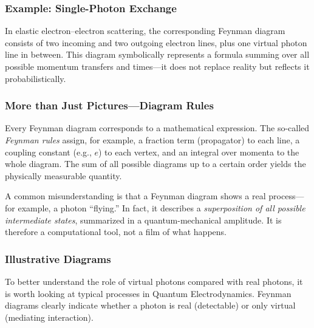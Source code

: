 \subsubsection*{Example: Single-Photon Exchange}
In elastic electron–electron scattering, the corresponding Feynman diagram consists of two incoming and two outgoing electron lines, plus one virtual photon line in between. This diagram symbolically represents a formula summing over all possible momentum transfers and times—it does not replace reality but reflects it probabilistically.

\subsubsection*{More than Just Pictures—Diagram Rules}
{}
Every Feynman diagram corresponds to a mathematical expression. The so-called \emph{Feynman rules} assign, for example, a fraction term (propagator) to each line, a coupling constant (e.g., $e$) to each vertex, and an integral over momenta to the whole diagram. The sum of all possible diagrams up to a certain order yields the physically measurable quantity.

\vspace{1em}
\begin{tcolorbox}[didaktikbox, title=A Diagram Is Not Reality]
	\label{boxx:Diagramm ist nicht gleich realität}
	A common misunderstanding is that a Feynman diagram shows a real process—for example, a photon “flying.” In fact, it describes a \emph{superposition of all possible intermediate states}, summarized in a quantum-mechanical amplitude. It is therefore a computational tool, not a film of what happens.
\end{tcolorbox}

\subsubsection{Illustrative Diagrams}

To better understand the role of virtual photons compared with real photons, it is worth looking at typical processes in Quantum Electrodynamics. Feynman diagrams clearly indicate whether a photon is real (detectable) or only virtual (mediating interaction).

